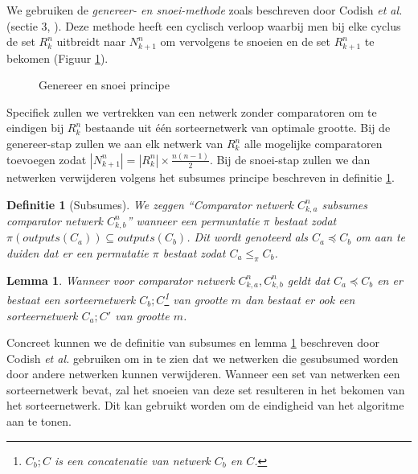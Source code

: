 \documentclass{article}
\newtheorem{lemma}{Lemma}
\newtheorem{definitie}{Definitie}
\begin{document}
We gebruiken de \textit{genereer- en snoei-methode} zoals beschreven door Codish \textit{et al.} (sectie 3, \cite{sortingNetworksSize2014}).
Deze methode heeft een cyclisch verloop waarbij men bij elke cyclus de set $R^n_k$ uitbreidt naar $N^n_{k+1}$ om vervolgens te snoeien en de set $R^n_{k+1}$ te bekomen (Figuur \ref{GenereerSnoei}).
\begin{figure}[!h]
\centering
{}
\caption{Genereer en snoei principe}
\label{GenereerSnoei}
\end{figure}
Specifiek zullen we vertrekken van een netwerk zonder comparatoren om te eindigen bij $R^n_k$ bestaande uit \'e\'en sorteernetwerk van optimale grootte.
Bij de genereer-stap zullen we aan elk netwerk van $R^n_k$ alle mogelijke comparatoren toevoegen zodat $|N^n_{k+1}| = |R^n_{k}| \times \frac{n\left(n-1\right)}{2}$.
Bij de snoei-stap zullen we dan netwerken verwijderen volgens het subsumes principe beschreven in definitie \ref{definitie1}.
\begin{definitie}[Subsumes] %
We zeggen ``Comparator netwerk $C^n_{k,a}$ subsumes comparator netwerk $C^n_{k,b}$'' wanneer een permuntatie $\pi$ bestaat zodat ${\pi\left(outputs\left(C_{a}\right)\right) \subseteq outputs\left(C_{b}\right)}$. Dit wordt genoteerd als $ C_{a} \preceq C_{b}$ om aan te duiden dat er een permutatie $\pi$ bestaat zodat $C_{a}\leq_\pi C_{b}$. %
\label{definitie1}
\end{definitie}
\begin{lemma}
Wanneer voor comparator netwerk $C^n_{k,a}, C^n_{k,b}$ geldt dat $ C_{a} \preceq C_{b}$ en er bestaat een sorteernetwerk $C_b;C$\footnote{$C_b;C$ is een concatenatie van netwerk $C_b$ en $C$.} van grootte $m$ dan bestaat er ook een sorteernetwerk $C_a;C'$ van grootte $m$.
\label{lemma2}
\end{lemma}
Concreet kunnen we de definitie van subsumes en lemma \ref{lemma2} beschreven door Codish \textit{et al.} \cite{sortingNetworksSize2014} gebruiken om in te zien dat we netwerken die gesubsumed worden door andere netwerken kunnen verwijderen.
Wanneer een set van netwerken een sorteernetwerk bevat, zal het snoeien van deze set resulteren in het bekomen van het sorteernetwerk.
Dit kan gebruikt worden om de eindigheid van het algoritme aan te tonen.
\end{document}
